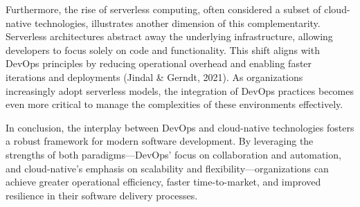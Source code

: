 Furthermore, the rise of serverless computing, often considered a subset of cloud-native technologies, illustrates another dimension of this complementarity. Serverless architectures abstract away the underlying infrastructure, allowing developers to focus solely on code and functionality. This shift aligns with DevOps principles by reducing operational overhead and enabling faster iterations and deployments (Jindal & Gerndt, 2021). As organizations increasingly adopt serverless models, the integration of DevOps practices becomes even more critical to manage the complexities of these environments effectively.

In conclusion, the interplay between DevOps and cloud-native technologies fosters a robust framework for modern software development. By leveraging the strengths of both paradigms—DevOps' focus on collaboration and automation, and cloud-native's emphasis on scalability and flexibility—organizations can achieve greater operational efficiency, faster time-to-market, and improved resilience in their software delivery processes.

